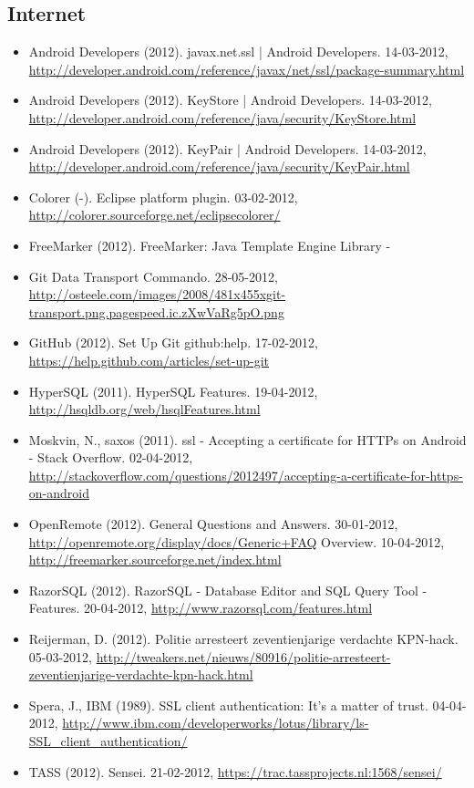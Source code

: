 \documentclass[]{article}
\begin{document}
\subsection{Internet}
\begin{itemize}
    \item Android Developers (2012). javax.net.ssl | Android Developers. 14-03-2012, \url{http://developer.android.com/reference/javax/net/ssl/package-summary.html}
    \item Android Developers (2012). KeyStore | Android Developers. 14-03-2012, \url{http://developer.android.com/reference/java/security/KeyStore.html}
    \item Android Developers (2012). KeyPair | Android Developers. 14-03-2012, \url{http://developer.android.com/reference/java/security/KeyPair.html}
    \item Colorer (-). Eclipse platform plugin. 03-02-2012, \url{http://colorer.sourceforge.net/eclipsecolorer/}
    \item FreeMarker (2012). FreeMarker: Java Template Engine Library -
    \item Git Data Transport Commando. 28-05-2012, \url{http://osteele.com/images/2008/481x455xgit-transport.png.pagespeed.ic.zXwVaRg5pO.png}
    \item GitHub (2012). Set Up Git github:help. 17-02-2012, \url{https://help.github.com/articles/set-up-git}
    \item HyperSQL (2011). HyperSQL Features. 19-04-2012, \url{http://hsqldb.org/web/hsqlFeatures.html}
    \item Moskvin, N., saxos (2011). ssl - Accepting a certificate for HTTPs on
Android - Stack Overflow. 02-04-2012, \url{http://stackoverflow.com/questions/2012497/accepting-a-certificate-for-https-on-android}
    \item OpenRemote (2012). General Questions and Answers. 30-01-2012, \url{http://openremote.org/display/docs/Generic+FAQ}
Overview. 10-04-2012, \url{http://freemarker.sourceforge.net/index.html}
    \item RazorSQL (2012). RazorSQL - Database Editor and SQL Query Tool -
Features. 20-04-2012, \url{http://www.razorsql.com/features.html}
    \item Reijerman, D. (2012). Politie arresteert zeventienjarige
verdachte KPN-hack. 05-03-2012, \url{http://tweakers.net/nieuws/80916/politie-arresteert-zeventienjarige-verdachte-kpn-hack.html}
    \item Spera, J., IBM (1989). SSL client authentication: It's a matter of
trust. 04-04-2012, \url{http://www.ibm.com/developerworks/lotus/library/ls-SSL_client_authentication/}
    \item TASS (2012). Sensei. 21-02-2012, \url{https://trac.tassprojects.nl:1568/sensei/}
\end{itemize}
\end{document}
